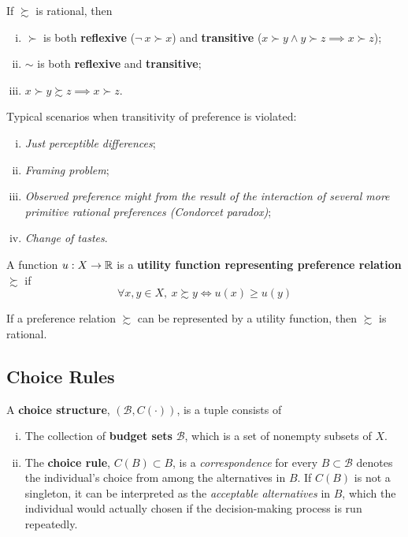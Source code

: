 \documentclass{article}
\begin{document}
		\begin{proposition}[1.B.1]
			If $\succsim$ is rational, then
			\begin{enumerate}[(i)]
				\item $\succ$ is both \textbf{reflexive} ($\neg\ x \succ x$) and \textbf{transitive} ($x \succ y \land y \succ z \implies x \succ z$);
				\item $\sim$ is both \textbf{reflexive} and \textbf{transitive};
				\item $x \succ y \succsim z \implies x \succ z$.
			\end{enumerate}
		\end{proposition}
		
		\begin{example}
			Typical scenarios when transitivity of preference is violated:
			\begin{enumerate}[(i)]
				\item \emph{Just perceptible differences};
				\item \emph{Framing problem};
				\item \emph{Observed preference might from the result of the interaction of several more primitive rational preferences (Condorcet paradox)};
				\item \emph{Change of tastes}.
			\end{enumerate}
		\end{example}
		
		\begin{definition}[1.B.2]
			A function $u: X \to \mathbb{R}$ is a \textbf{utility function representing preference relation} $\succsim$ if
			\begin{equation}
				\forall x, y \in X,\ x \succsim y \iff u(x) \geq u(y)
			\end{equation}
		\end{definition}
		
		\begin{proposition}[1.B.2]
			If a preference relation $\succsim$ can be represented by a utility function, then $\succsim$ is rational.
		\end{proposition}
	
	\subsection{Choice Rules}
		\begin{definition}
			A \textbf{choice structure}, $(\mathscr{B}, C(\cdot))$, is a tuple consists of
			\begin{enumerate}[(i)]
				\item The collection of \textbf{budget sets} $\mathscr{B}$, which is a set of nonempty subsets of $X$.
				\item The \textbf{choice rule}, $C(B) \subset B$, is a \emph{correspondence} for every $B \subset \mathscr{B}$ denotes the individual's choice from among the alternatives in $B$. If $C(B)$ is not a singleton, it can be interpreted as the \emph{acceptable alternatives} in $B$, which the individual would actually chosen if the decision-making process is run repeatedly. 
			\end{enumerate}
		\end{definition}
		
\end{document}
